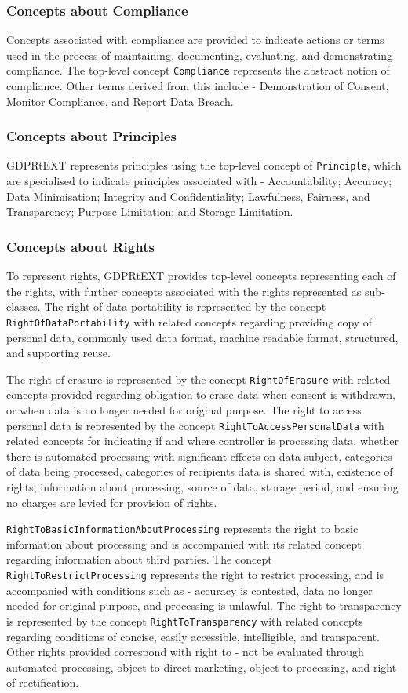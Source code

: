 \subsubsection{Concepts about Compliance}
Concepts associated with compliance are provided to indicate actions or terms used in the process of maintaining, documenting, evaluating, and demonstrating compliance. The top-level concept \texttt{Compliance} represents the abstract notion of compliance. Other terms derived from this include - Demonstration of Consent, Monitor Compliance, and Report Data Breach.

\subsubsection{Concepts about Principles}
GDPRtEXT represents principles using the top-level concept of \texttt{Principle}, which are specialised to indicate principles associated with - Accountability; Accuracy; Data Minimisation; Integrity and Confidentiality; Lawfulness, Fairness, and Transparency; Purpose Limitation; and Storage Limitation.

\subsubsection{Concepts about Rights}
To represent rights, GDPRtEXT provides top-level concepts representing each of the rights, with further concepts associated with the rights represented as sub-classes. The right of data portability is represented by the concept \texttt{RightOfDataPortability} with related concepts regarding providing copy of personal data, commonly used data format, machine readable format, structured, and supporting reuse.

The right of erasure is represented by the concept \texttt{RightOfErasure} with related concepts provided regarding obligation to erase data when consent is withdrawn, or when data is no longer needed for original purpose. The right to access personal data is represented by the concept \texttt{RightToAccessPersonalData} with related concepts for indicating if and where controller is processing data, whether there is automated processing with significant effects on data subject, categories of data being processed, categories of recipients data is shared with, existence of rights, information about processing, source of data, storage period, and ensuring no charges are levied for provision of rights.

\texttt{RightToBasicInformationAboutProcessing} represents the right to basic information about processing and is accompanied with its related concept regarding information about third parties. The concept \texttt{RightToRestrictProcessing} represents the right to restrict processing, and is accompanied with conditions such as - accuracy is contested, data no longer needed for original purpose, and processing is unlawful. The right to transparency is represented by the concept \texttt{RightToTransparency} with related concepts regarding conditions of concise, easily accessible, intelligible, and transparent. Other rights provided correspond with right to - not be evaluated through automated processing, object to direct marketing,  object to processing, and right of rectification.

